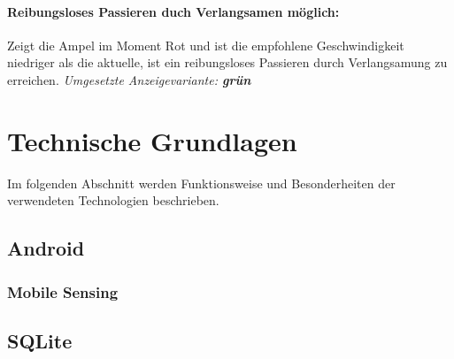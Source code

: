 \paragraph{Reibungsloses Passieren duch Verlangsamen möglich:} Zeigt die Ampel im Moment Rot und ist die empfohlene Geschwindigkeit niedriger als die aktuelle, ist ein reibungsloses Passieren durch Verlangsamung zu erreichen.
\textit{Umgesetzte Anzeigevariante: \textbf{grün}}
\section{Technische Grundlagen}
Im folgenden Abschnitt werden Funktionsweise und Besonderheiten der verwendeten Technologien beschrieben.
\subsection{Android}
\subsubsection{Mobile Sensing}
\subsection{SQLite}
